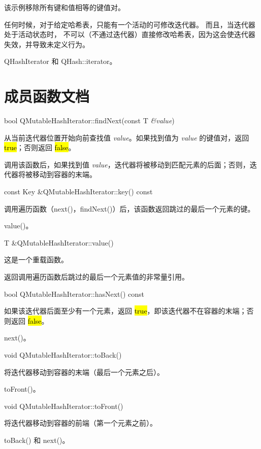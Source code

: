 该示例移除所有键和值相等的键值对。

任何时候，对于给定哈希表，只能有一个活动的可修改迭代器。
而且，当迭代器处于活动状态时，
不可以（不通过迭代器）直接修改哈希表，因为这会使迭代器失效，并导致未定义行为。

\begin{seeAlso}
QHashIterator 和 QHash::iterator。
\end{seeAlso}

\section{成员函数文档}


bool QMutableHashIterator::findNext(const T \emph{\&value})

从当前迭代器位置开始向前查找值 \emph{value}。如果找到值为 \emph{value} 的键值对，返回 \hl{true}；否则返回 \hl{false}。

调用该函数后，如果找到值 \emph{value}，迭代器将被移动到匹配元素的后面；否则，迭代器将被移动到容器的末端。

const Key \&QMutableHashIterator::key() const

调用遍历函数（next()，findNext()）后，该函数返回跳过的最后一个元素的键。

\begin{seeAlso}
value()。
\end{seeAlso}

T \&QMutableHashIterator::value()

这是一个重载函数。

返回调用遍历函数后跳过的最后一个元素值的非常量引用。

bool QMutableHashIterator::hasNext() const

如果该迭代器后面至少有一个元素，返回 \hl{true}，即该迭代器不在容器的末端；否则返回 \hl{false}。

\begin{seeAlso}
next()。
\end{seeAlso}

void QMutableHashIterator::toBack()

将迭代器移动到容器的末端（最后一个元素之后）。

\begin{seeAlso}
toFront()。
\end{seeAlso}

void QMutableHashIterator::toFront()

将迭代器移动到容器的前端（第一个元素之前）。

\begin{seeAlso}
toBack() 和 next()。
\end{seeAlso}

